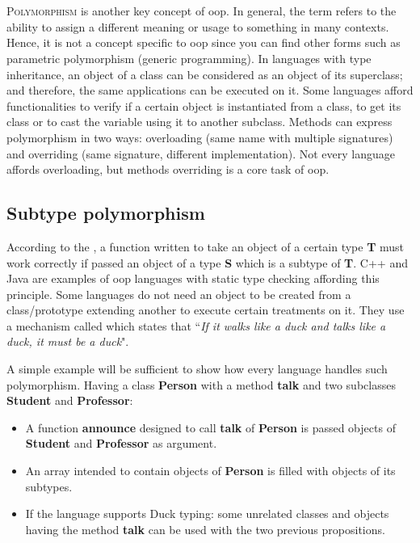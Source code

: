\documentclass{KodeBook}
\begin{document}
\fi

\chapter{}

\begin{introduction}
	\lettrine{P}{olymorphism} is another key concept of \ac{oop}. 
	In general, the term refers to the ability to assign a different meaning or usage to something in many contexts.
	Hence, it is not a concept specific to \ac{oop} since you can find other forms such as parametric polymorphism (generic programming). 
	In languages with type inheritance, an object of a class can be considered as an object of its superclass; and therefore, the same applications can be executed on it.
	Some languages afford functionalities to verify if a certain object is instantiated from a class, to get its class or to cast the variable using it to another subclass.
	Methods can express polymorphism in two ways: overloading (same name with multiple signatures) and overriding (same signature, different implementation). 
	Not every language affords overloading, but methods overriding is a core task of \ac{oop}.
\end{introduction} 

\section{Subtype polymorphism}

According to the  \citep{1987-liskov}, a function written to take an object of a certain type \textbf{T} must work correctly if passed an object of a type \textbf{S} which is a subtype of \textbf{T}.
C++ and Java are examples of \ac{oop} languages with static type checking affording this principle. 
Some languages do not need an object to be created from a class/prototype extending another to execute certain treatments on it. 
They use a mechanism called  which states that ``\textit{If it walks like a duck and talks like a duck, it must be a duck}". 

A simple example will be sufficient to show how every language handles such polymorphism. 
Having a class \textbf{Person} with a method \textbf{talk} and two subclasses \textbf{Student} and \textbf{Professor}:
\begin{itemize}
	\item A function \textbf{announce} designed to call \textbf{talk} of \textbf{Person} is passed objects of \textbf{Student} and \textbf{Professor} as argument.
	\item An array intended to contain objects of \textbf{Person} is filled with objects of its subtypes.
	\item If the language supports Duck typing: some unrelated classes and objects having the method \textbf{talk} can be used with the two previous propositions.
\end{itemize}
\end{document}
